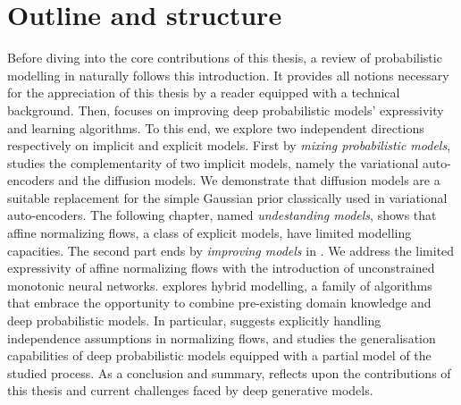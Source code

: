 \section{Outline and structure}

Before diving into the core contributions of this thesis, a review of probabilistic modelling in  naturally follows this introduction. It provides all notions necessary for the appreciation of this thesis by a reader equipped with a technical background. Then,  focuses on improving deep probabilistic models' expressivity and learning algorithms. To this end, we explore two independent directions respectively on implicit and explicit models. First by \textit{mixing probabilistic models},  studies the complementarity of two implicit models, namely the variational auto-encoders and the diffusion models. We demonstrate that diffusion models are a suitable replacement for the simple Gaussian prior classically used in variational auto-encoders. The following chapter, named \textit{undestanding models}, shows that affine normalizing flows, a class of explicit models, have limited modelling capacities. The second part ends by \textit{improving models} in . We address the limited expressivity of affine normalizing flows with the introduction of unconstrained monotonic neural networks.  explores hybrid modelling, a family of algorithms that embrace the opportunity to combine pre-existing domain knowledge and deep probabilistic models. In particular,  suggests explicitly handling independence assumptions in normalizing flows, and  studies the generalisation capabilities of deep probabilistic models equipped with a partial model of the studied process. As a conclusion and summary,  reflects upon the contributions of this thesis and current challenges faced by deep generative models.




